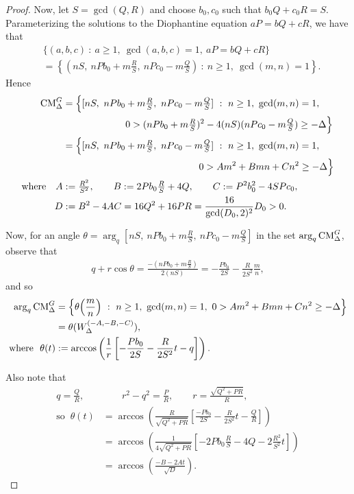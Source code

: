\documentclass[11pt,letterpaper,reqno]{amsart}
\numberwithin{equation}{section}
\numberwithin{figure}{section}
\numberwithin{table}{section}
\newcommand{\lrp}[1]{\left(#1\right)}
\newcommand{\lrb}[1]{\left[#1\right]}
\newcommand{\lrcb}[1]{\left\{#1\right\}}
\newcommand{\CM}{\textnormal{CM}}
\begin{document}
\begin{proof}
Now, let $S = \gcd(Q,R)$ and choose $b_0,c_0$ such that $b_0Q+c_0R = S$.
Parameterizing the solutions to the Diophantine equation $aP = bQ+cR$, we have that
\begin{align} 
    &\Big\{ (a,b,c) ~:~ a \ge 1,~ \gcd(a,b,c)=1,~ 
    aP=bQ+cR
    \Big\} \\
    &= \lrcb{ (nS,~nPb_0+m\tfrac{R}{S},~nPc_0-m\tfrac{Q}{S}) ~:~ n \ge 1,~ \gcd(m,n)=1 }.
\end{align}
Hence
\begin{align}
    \CM^{G}_{\Delta} 
    &= \Big\{  [nS,~nPb_0+m\tfrac{R}{S},~nPc_0-m\tfrac{Q}{S}]  ~:~ n \ge 1,~ \gcd(m,n)=1,\\
    &\hspace{23mm}  0 >(nPb_0+m\tfrac{R}{S})^2-4(nS)(nPc_0-m\tfrac{Q}{S}) \ge -\Delta
    \Big\} \\
    &= \Big\{[nS,~nPb_0+m\tfrac{R}{S},~nPc_0-m\tfrac{Q}{S}] ~:~ n\ge 1,~ \gcd(m,n)=1,~ \\
    &\hspace{50mm} 0 > A m^2 + B mn + C n^2  \ge -\Delta
    \Big\} \label{eqn:CM-GABC-set-formula} \\
    \text{where}\quad  A&:=\tfrac{R^2}{S^2}, \qquad B := 2Pb_0 \tfrac{R}{S}+4Q, \qquad C := P^2b_0^2-4SPc_0,  \label{eqn:def-ABC-for-CM^G-set-def}\\
     D &:= B^2 -4A C = 16Q^2+16PR = \frac{16}{\gcd(D_0,2)^2} D_0 > 0.
\end{align}


Now, for an angle $\theta=\arg_q [nS,~nPb_0+m\tfrac{R}{S},~nPc_0-m\tfrac{Q}{S}]$ in the set $\mathrm{arg}_q\, \CM^{G}_{\Delta}$, observe that 
\begin{align}
    q+r \cos\theta = \frac{-(nPb_0+m \tfrac{R}{S})}{2(nS)} = - \frac{Pb_0}{2S} - \frac{R}{2S^2} \frac{m}{n},
\end{align}
and so
\begin{align}
    \arg_q \CM^{G}_{\Delta} 
    &= \Big\{\theta\!\lrp{\frac{m}{n}} ~:~ n\ge 1,~ \gcd(m,n)=1,~   0 >A m^2 + B mn + C n^2  \ge -\Delta
    \Big\} \\
    &= \theta(W_{\Delta}^{(-A,-B,-C)}), \\
    \text{where }\ \theta(t) &:= \arccos\lrp{ \frac 1 r \lrb{- \frac{Pb_0}{2S} - \frac{R}{2S^2} t - q}}.
\end{align}

Also note that
\begin{align} 
    q = \frac{Q}{R}, &\qquad r^2-q^2 = \frac{P}{R}, \qquad r=\frac{\sqrt{Q^2+PR}}{R}, \label{eqn:q-r-formulas-via-PQR} \\
    \text{so }\ 
    \theta(t) 
    &= \arccos\lrp{ \frac{R}{\sqrt{Q^2+PR}} \lrb{ 
        \frac{-Pb_0}{2S} - \frac{R}{2S^2} t - \frac{Q}{R}
    }} \\
    &= \arccos\lrp{ \frac{1}{4\sqrt{Q^2+PR}} \lrb{ 
        -2Pb_0 \tfrac{R}{S} - 4Q - 2\frac{R^2}{S^2} t 
    }} \\
    &= \arccos\lrp{ \frac{ -B - 2A t }{\sqrt D} }.
\end{align}


\end{proof}
\end{document}
